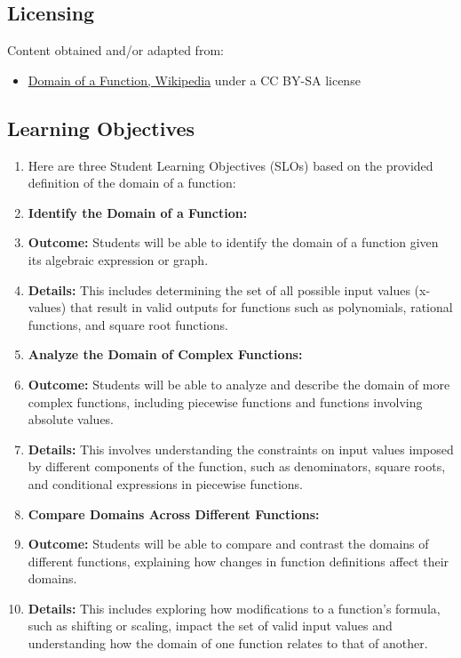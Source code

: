 \subsection{Licensing}
\label{sss:lice-73529}




Content obtained and/or adapted from:



\begin{itemize}
    \item \href{https://en.wikipedia.org/wiki/Domain_of_a_function}{Domain of a Function, Wikipedia} under a CC BY-SA license
\end{itemize}


\subsection{Learning Objectives}
\label{ssec:lear-fe6e}


\begin{enumerate}
    \item Here are three Student Learning Objectives (SLOs) based on the provided definition of the domain of a function:
    \item \textbf{Identify the Domain of a Function:}
    \item \textbf{Outcome:} Students will be able to identify the domain of a function given its algebraic expression or graph.
    \item \textbf{Details:} This includes determining the set of all possible input values (x-values) that result in valid outputs for functions such as polynomials, rational functions, and square root functions.
    \item \textbf{Analyze the Domain of Complex Functions:}
    \item \textbf{Outcome:} Students will be able to analyze and describe the domain of more complex functions, including piecewise functions and functions involving absolute values.
    \item \textbf{Details:} This involves understanding the constraints on input values imposed by different components of the function, such as denominators, square roots, and conditional expressions in piecewise functions.
    \item \textbf{Compare Domains Across Different Functions:}
    \item \textbf{Outcome:} Students will be able to compare and contrast the domains of different functions, explaining how changes in function definitions affect their domains.
    \item \textbf{Details:} This includes exploring how modifications to a function's formula, such as shifting or scaling, impact the set of valid input values and understanding how the domain of one function relates to that of another.
\end{enumerate}



